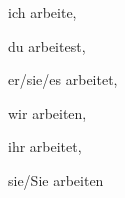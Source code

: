 \subject{Präsens}

ich arbeite,

du arbeitest,

er/sie/es arbeitet,

wir arbeiten,

ihr arbeitet,

sie/Sie arbeiten



